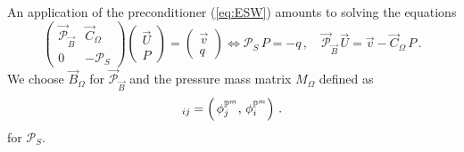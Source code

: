 An application of the preconditioner (\ref{eq:ESW}) amounts to solving the
equations
\begin{equation*}
\begin{pmatrix}
\vec{\mathcal{P}}_{\vec B} & \vec C_\Omega \\
0 & -\mathcal{P}_S
\end{pmatrix}
\begin{pmatrix} \vec U \\ P \end{pmatrix}
= \begin{pmatrix} \vec v \\ q \end{pmatrix}
\iff
\mathcal{P}_S\,P = -q\,,\quad \vec{\mathcal{P}}_{\vec B}\,\vec U = \vec v -
\vec C_\Omega\,P\,.
\end{equation*}
We choose $\vec B_\Omega$  for $\vec{\mathcal{P}}_{\vec B}$ and the pressure
mass matrix $M_\Omega$ defined as
\begin{equation*}
[M_\Omega]_{ij} = \left(\,\phi_j^{\pspace^m},\, \phi_i^{\pspace^m}\right)\,.
\end{equation*}
for $\mathcal{P}_S$.

